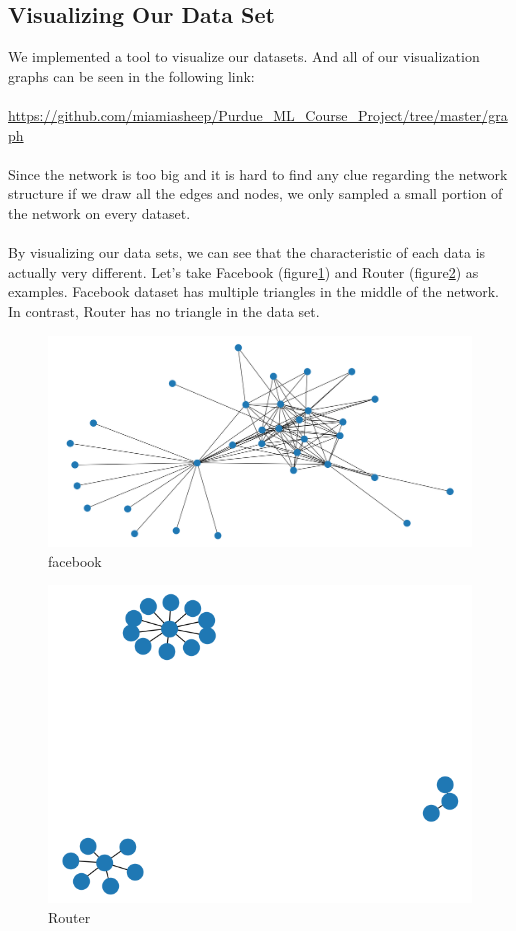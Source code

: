 \documentclass[12pt]{article}
\begin{document}
\subsection{Visualizing Our Data Set}
We implemented a tool to visualize our datasets. And all of our visualization graphs can be seen in the following link:
\\
\\
\url{https://github.com/miamiasheep/Purdue_ML_Course_Project/tree/master/graph}
\\
\\
Since the network is too big and it is hard to find any clue regarding the network structure if we draw all the edges and nodes, we only sampled a small portion of the network on every dataset.
\\
\\
By visualizing our data sets, we can see that the characteristic of each data is actually very different. Let's take Facebook (figure\ref{fig:facebook}) and Router (figure\ref{fig:Router}) as examples. Facebook dataset has multiple triangles in the middle of the network. In contrast, Router has no triangle in the data set.


\begin{figure}[h]
	\centering
	\includegraphics[scale=0.3]{Facebook}
	\caption{facebook}
	\label{fig:facebook}
\end{figure}

\begin{figure}[h]
	\centering
	\includegraphics[scale=0.3]{Router}
	\caption{Router}
	\label{fig:Router}
\end{figure}
\end{document}

